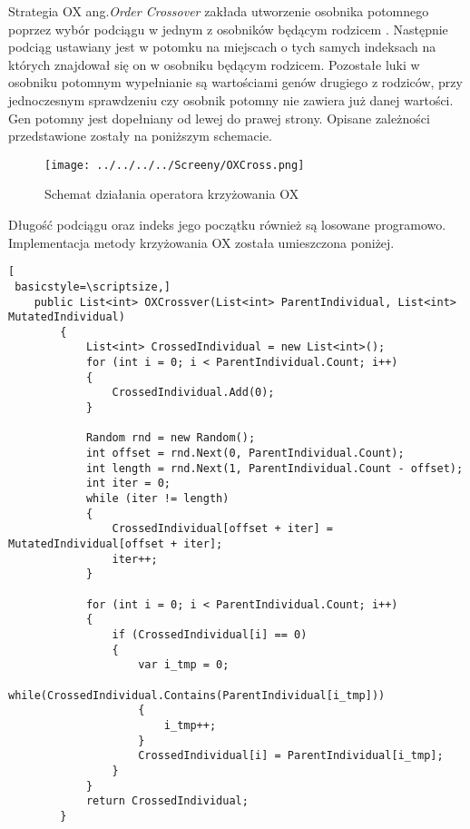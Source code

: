 Strategia OX ang.\textit{Order Crossover} zakłada utworzenie osobnika potomnego poprzez wybór podciągu w jednym z osobników będącym rodzicem \cite{cross}. Następnie podciąg ustawiany jest w potomku na miejscach o tych samych indeksach na których znajdował się on w osobniku będącym rodzicem. Pozostałe luki w osobniku potomnym wypełnianie są wartościami genów drugiego z rodziców, przy jednoczesnym sprawdzeniu czy osobnik potomny nie zawiera już danej wartości. Gen potomny jest dopełniany od lewej do prawej strony. Opisane zależności przedstawione zostały na poniższym schemacie.


\begin{figure}[h!]
\centering
		\texttt{[image: ../../../../Screeny/OXCross.png]}
		\caption{Schemat działania operatora krzyżowania OX}
		\label{schematOX}			
\end{figure}

Długość podciągu oraz indeks jego początku również są losowane programowo. Implementacja metody krzyżowania OX została umieszczona poniżej.

\begin{program}[h!]
\begin{lstlisting}[
 basicstyle=\scriptsize,]
	public List<int> OXCrossver(List<int> ParentIndividual, List<int> MutatedIndividual)
        {
            List<int> CrossedIndividual = new List<int>();
            for (int i = 0; i < ParentIndividual.Count; i++)
            {
                CrossedIndividual.Add(0);
            }

            Random rnd = new Random();
            int offset = rnd.Next(0, ParentIndividual.Count);
            int length = rnd.Next(1, ParentIndividual.Count - offset);
            int iter = 0;
            while (iter != length)
            {
                CrossedIndividual[offset + iter] = MutatedIndividual[offset + iter];
                iter++;
            }

            for (int i = 0; i < ParentIndividual.Count; i++)
            {
                if (CrossedIndividual[i] == 0)
                {
                    var i_tmp = 0;
                    while(CrossedIndividual.Contains(ParentIndividual[i_tmp]))
                    {
                        i_tmp++;
                    }
                    CrossedIndividual[i] = ParentIndividual[i_tmp];
                }
            }
            return CrossedIndividual;
        }
\end{lstlisting}
\end{program}


